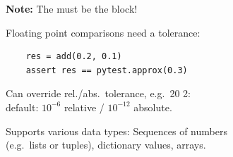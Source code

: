 \textbf{Note:} The  must be  the  block!



Floating point comparisons need a tolerance:
\vspace{-.6em}

\begin{verbatim}
    res = add(0.2, 0.1)
    assert res == pytest.approx(0.3)
\end{verbatim}
\vspace{-.6em}

Can override rel./abs.\ tolerance, e.g.\ 20 \textpm{} 2\textdegree: \\
default: $10^{-6}$ relative / $10^{-12}$ absolute.

Supports various data types: Sequences of numbers \\ (e.g.\ lists or tuples), dictionary values,  arrays.
